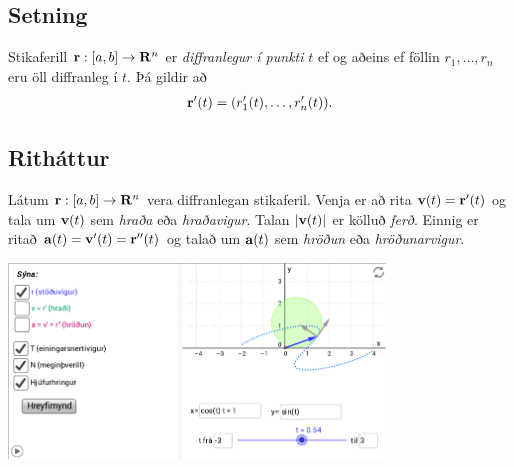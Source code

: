 \documentclass[a4paper,10pt,icelandic]{sphinxmanual}
\begin{document}
\subsection{Setning}
\label{Kafli1:setning}
Stikaferill
\(\mbox{${\bf r}$}:  [a,b]\rightarrow \mbox{${\bf R}^n$}\) er
\emph{diffranlegur í punkti} \(t\) ef og aðeins ef föllin
\(r_1,\ldots,r_n\) eru öll diffranleg í \(t\). Þá gildir að
\begin{gather}
\begin{split}\displaystyle \mbox{${\bf r}$}'(t)=(r'_1(t),\ldots,r'_n(t)).\end{split}\notag
\end{gather}

\subsection{Ritháttur}
\label{Kafli1:index-3}\label{Kafli1:id3}
Látum \(\mbox{${\bf r}$}:  [a,b]\rightarrow \mbox{${\bf R}^n$}\)
vera diffranlegan stikaferil. Venja er að rita
\(\mbox{${\bf v}$}(t)=\mbox{${\bf r}$}'(t)\) og tala um
\(\mbox{${\bf v}$}(t)\) sem \emph{hraða} eða \emph{hraðavigur}. Talan
\(|\mbox{${\bf v}$}(t)|\) er kölluð \emph{ferð}. Einnig er ritað
\(\mbox{${\bf a}$}(t)=\mbox{${\bf v}$}'(t)=\mbox{${\bf r}$}''(t)\)
og talað um \(\mbox{${\bf a}$}(t)\) sem \emph{hröðun} eða
\emph{hröðunarvigur}.


\begin{center}
\includegraphics[width=10cm,keepaspectratio=true]{stikaferill.png}
\end{center}
\end{document}
